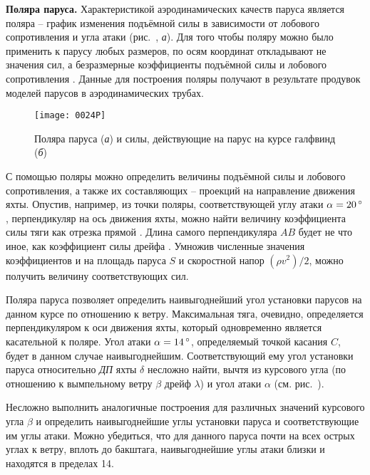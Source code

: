 \textbf{Поляра паруса.} Характеристикой аэродинамических качеств паруса является поляра \--- график изменения подъёмной силы в зависимости от лобового сопротивления и угла атаки (рис.~, \textit{а}). Для того чтобы поляру можно было применить к парусу любых размеров, по осям координат откладывают не значения сил, а безразмерные коэффициенты подъёмной силы  и лобового сопротивления . Данные для построения поляры получают в результате продувок моделей парусов в аэродинамических трубах. 

\begin{figure}[htb]
  \centering
  \texttt{[image: 0024P]}
  \caption{Поляра паруса (\textit{а}) и силы, действующие на парус на курсе галфвинд (\textit{б})}
  \label{fig:24}
\end{figure}

С помощью поляры можно определить величины подъёмной силы и лобового сопротивления, а также их составляющих \--- проекций на направление движения яхты. Опустив, например, из точки поляры, соответствующей углу атаки $\alpha = 20\,^\circ$, перпендикуляр на ось движения яхты, можно найти величину коэффициента силы тяги  как отрезка прямой . Длина самого перпендикуляра $AB$ будет не что иное, как коэффициент силы дрейфа . Умножив численные значения коэффициентов  и  на площадь паруса $S$ и скоростной напор $(\rho v^2)/2$, можно получить величину соответствующих сил. 

Поляра паруса позволяет определить наивыгоднейший угол установки парусов на данном курсе по отношению к ветру. Максимальная тяга, очевидно, определяется перпендикуляром к оси движения яхты, который одновременно является касательной к поляре. Угол атаки $\alpha = 14\,^\circ$, определяемый точкой касания $C$, будет в данном случае наивыгоднейшим. Соответствующий ему угол установки паруса относительно \textit{ДП} яхты $\delta$ несложно найти, вычтя из курсового угла (по отношению к вымпельному ветру $\beta$ дрейф $\lambda$) и угол атаки $\alpha$ (см. рис.~).

Несложно выполнить аналогичные построения для различных значений курсового угла $\beta$ и определить наивыгоднейшие углы установки паруса и соответствующие им углы атаки. Можно убедиться, что для данного паруса почти на всех острых углах к ветру, вплоть до бакштага, наивыгоднейшие углы атаки близки и находятся в пределах 14\gr.


